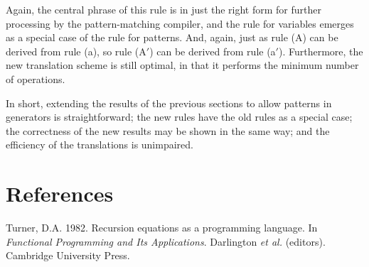 
Again, the central phrase of this rule is in just the right form for further
processing by the pattern-matching compiler, and the rule for variables
emerges as a special case of the rule for patterns. And, again, just as rule (A)
can be derived from rule (a), so rule (A$'$) can be derived from rule (a$'$).
Furthermore, the new translation scheme is still optimal, in that it performs
the minimum number of  operations.

In short, extending the results of the previous sections to allow patterns in
generators is straightforward; the new rules have the old rules as a special
case; the correctness of the new results may be shown in the same way; and the
efficiency of the translations is unimpaired.

\section*{References}

\begin{references}
\item Turner, D.A. 1982. {Recursion equations as a programming language}. In \emph{Functional Programming and Its Applications}. Darlington \textit{et al.} (editors). Cambridge University Press.
\end{references}
